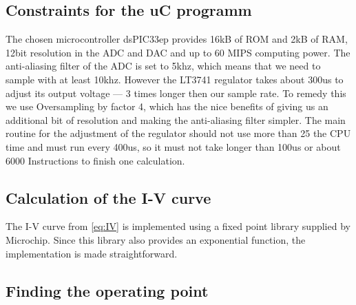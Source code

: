 

\subsection{Constraints for the uC programm}

The chosen microcontroller dsPIC33ep provides 16kB  of ROM and 2kB of RAM, 12bit
resolution  in  the  ADC  and  DAC  and  up  to  60  MIPS  computing  power. The
anti-aliasing filter of the ADC is set to 5khz, which  means  that  we  need  to
sample with at least 10khz. However the LT3741 regulator  takes  about  300us to
adjust  its  output  voltage  --- 3 times longer then our sample rate. To remedy
this  we use Oversampling by factor 4, which has the nice benefits of giving  us
an additional bit of resolution and making the anti-aliasing filter simpler. The
main routine for the adjustment of the regulator should not use more than 25%
the CPU  time and must run every 400us, so it must not take longer than 100us or
about 6000 Instructions to finish one calculation.


\subsection{Calculation of the I-V curve}

The  I-V  curve  from  \eqref{eq:IV} is implemented using a fixed point  library
supplied by Microchip. Since this library also provides an exponential function,
the implementation is made straightforward.


\subsection{Finding the operating point}

